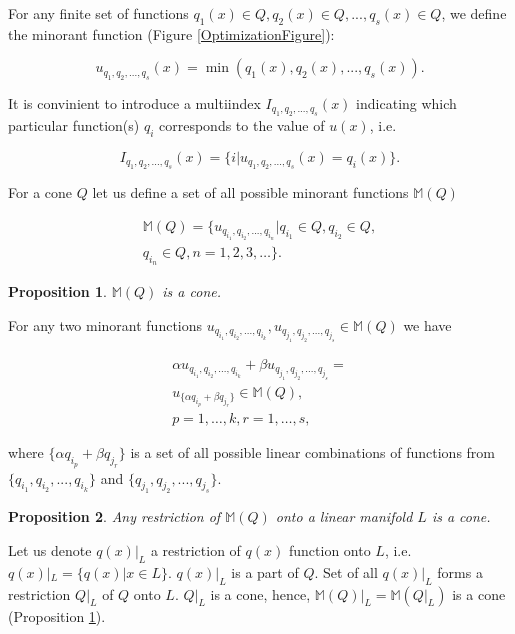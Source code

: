 \documentclass[preprint,12pt,twocolumn]{elsarticle}
\newtheorem{prop}{Proposition}
\newenvironment{proof}[1][Proof]{\begin{trivlist}
\item[\hskip \labelsep {\bfseries #1}]}{\end{trivlist}}
\begin{document}
For any finite set of functions ${q_1(x)\in Q, q_2(x)\in Q,..., q_s(x)\in Q}$, we define the minorant function (Figure \ref{OptimizationFigure}):

\begin{equation}\label{minorant}
u_{q_1,q_2,...,q_s}(x) = \min(q_1(x),q_2(x),...,q_s(x)).
\end{equation}

It is convinient to introduce a multiindex $I_{q_1,q_2,...,q_s}(x)$ indicating which particular function(s) $q_i$ corresponds to the value of $u(x)$, i.e.

\begin{equation}\label{minorant_index}
I_{q_1,q_2,...,q_s}(x) = \{i|u_{q_1,q_2,...,q_s}(x)=q_i(x)\}.
\end{equation}

For a cone $Q$ let us define a set of all possible minorant functions $\mathbb{M}(Q)$

\begin{equation}\label{minorant_index}
\begin{split}
\mathbb{M}(Q) = \{ u_{q_{i_1},q_{i_2},...,q_{i_n}} | q_{i_1}\in Q, q_{i_2}\in Q, \\ q_{i_n}\in Q, n = 1,2,3,\dots \}.
\end{split}
\end{equation}

\begin{prop}\label{Misacone}
$\mathbb{M}(Q)$ is a cone.
\end{prop}
\begin{proof}
For any two minorant functions $u_{q_{i_1},q_{i_2},...,q_{i_k}}, u_{q_{j_1},q_{j_2},...,q_{j_s}}\in \mathbb{M}(Q)$ we have

\begin{equation}
\begin{split}
\alpha u_{q_{i_1},q_{i_2},...,q_{i_k}} + \beta u_{q_{j_1},q_{j_2},...,q_{j_s}} = \\ u_{\{\alpha q_{i_p}+\beta q_{j_r}\}} \in \mathbb{M}(Q), \\ p=1,\dots,k, r=1,\dots,s,
\end{split}
\end{equation}

\noindent where ${\{\alpha q_{i_p}+\beta q_{j_r}\}}$ is a set of all possible linear combinations of functions from $\{q_{i_1},q_{i_2},...,q_{i_k}\}$ and $\{q_{j_1},q_{j_2},...,q_{j_s}\}$.
\end{proof}

\begin{prop}\label{Mrestrictedisacone}
Any restriction of $\mathbb{M}(Q)$ onto a linear manifold $L$ is a cone.
\end{prop}
\begin{proof}
Let us denote $q(x)|_L$ a restriction of $q(x)$ function onto $L$, i.e. $q(x)|_L = \{q(x)|x\in L\}$. $q(x)|_L$ is a part of $Q$.
Set of all $q(x)|_L$ forms a restriction $Q|_L$ of $Q$ onto $L$. $Q|_L$ is a cone, hence, $\mathbb{M}(Q)|_L = \mathbb{M}(Q|_L)$ is a cone (Proposition \ref{Misacone}).
\end{proof}
\end{document}

